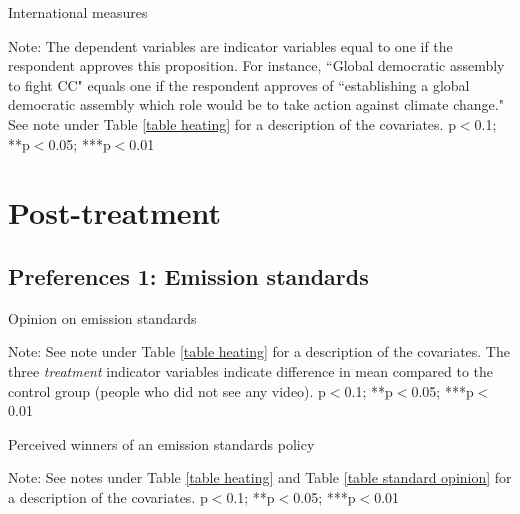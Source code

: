 \documentclass{article}
\begin{document}
\begin{landscape}
	\begin{table}[h!]
	\caption{International measures}
	\begin{center}
		\scalebox{0.6}{}
	\end{center}
	{\footnotesize Note: The dependent variables are indicator variables equal to one if the respondent approves this proposition. For instance, ``Global democratic assembly to fight CC" equals one if the respondent approves of ``establishing a global democratic assembly which role would be to take action against climate change." See note under Table \ref{table heating} for a description of the covariates.
	\newline *p$<$0.1; **p$<$0.05; ***p$<$0.01}
\end{table}	
\end{landscape}


\clearpage
\section{Post-treatment}
\subsection{Preferences 1: Emission standards}

\begin{table}[h!]
	\caption{Opinion on emission standards} \label{table standard opinion}
	\begin{center}
		\scalebox{0.7}{}
	\end{center}
	{\footnotesize Note: See note under Table \ref{table heating} for a description of the covariates. The three \textit{treatment} indicator variables indicate difference in mean compared to the control group (people who did not see any video).
	\newline *p$<$0.1; **p$<$0.05; ***p$<$0.01}
\end{table}	

\begin{table}[h!]
	\caption{Perceived winners of an emission standards policy}
	\begin{center}
		\scalebox{0.7}{}
	\end{center}
	{\footnotesize Note: See notes under Table \ref{table heating} and Table \ref{table standard opinion} for a description of the covariates.
	\newline *p$<$0.1; **p$<$0.05; ***p$<$0.01}
\end{table}	
\end{document}
